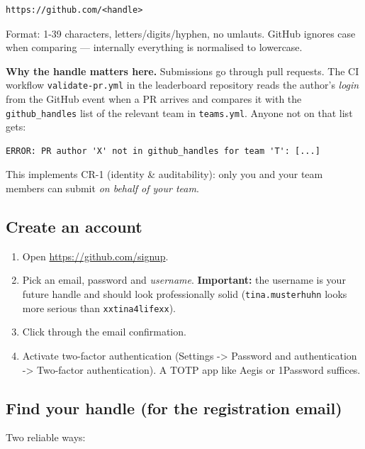 \documentclass[
  english,
  letterpaper,
]{scrbook}
\providecommand{\tightlist}{%
  \setlength{\itemsep}{0pt}\setlength{\parskip}{0pt}}
\begin{document}
\begin{verbatim}
https://github.com/<handle>
\end{verbatim}

Format: 1-39 characters, letters/digits/hyphen, no umlauts. GitHub
ignores case when comparing --- internally everything is normalised to
lowercase.

\textbf{Why the handle matters here.} Submissions go through pull
requests. The CI workflow \texttt{validate-pr.yml} in the leaderboard
repository reads the author's \emph{login} from the GitHub event when a
PR arrives and compares it with the \texttt{github\_handles} list of the
relevant team in \texttt{teams.yml}. Anyone not on that list gets:

\begin{verbatim}
ERROR: PR author 'X' not in github_handles for team 'T': [...]
\end{verbatim}

This implements CR-1 (identity \& auditability): only you and your team
members can submit \emph{on behalf of your team}.

\subsection{Create an account}\label{create-an-account}

\begin{enumerate}
\def\labelenumi{\arabic{enumi}.}
\tightlist
\item
  Open \url{https://github.com/signup}.
\item
  Pick an email, password and \emph{username}. \textbf{Important:} the
  username is your future handle and should look professionally solid
  (\texttt{tina.musterhuhn} looks more serious than
  \texttt{xxtina4lifexx}).
\item
  Click through the email confirmation.
\item
  Activate two-factor authentication (Settings -\textgreater{} Password
  and authentication -\textgreater{} Two-factor authentication). A TOTP
  app like Aegis or 1Password suffices.
\end{enumerate}

\subsection{Find your handle (for the registration
email)}\label{find-your-handle-for-the-registration-email}

Two reliable ways:
\end{document}

